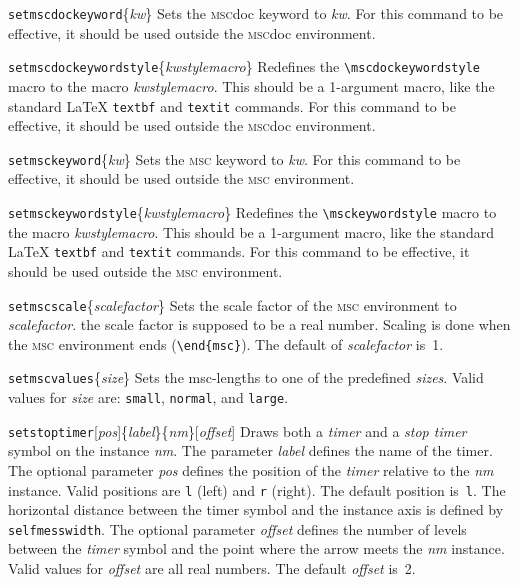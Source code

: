 \documentclass[a4paper]{article}
\newcommand{\cmd}[1]{\texttt{\bslash #1}}
\newcommand{\acro}[1]{{\scshape\lowercase{#1}}}
\newcommand\MSC{\acro{MSC}}
\newcommand{\MSCdoc}{\MSC{}doc}
\newcommand{\opt}[1]{[#1]}
\newenvironment{defs}{%
  \begin{list}{}%
              {\setlength{\labelwidth}{0pt}%
               \setlength{\labelsep}{1em}%
               \setlength{\leftmargin}{1em}%
               \setlength{\parsep}{1ex}%
               \setlength{\listparindent}{0pt}%
               \setlength{\rightmargin}{0pt}%
               \renewcommand{\makelabel}[1]{##1}%
               \raggedright%
              }%
  }{%
  \end{list}}
\begin{document}
\begin{defs}
\item[\cmd{setmscdockeyword}\{\emph{kw}\}] Sets the \MSCdoc{} keyword to
\emph{kw}. For this command to be effective, it should be used outside
the \MSCdoc{} environment.

\item[\cmd{setmscdockeywordstyle}\{\emph{kwstylemacro}\}] Redefines the
\verb|\mscdockeywordstyle| macro to the macro \emph{kwstylemacro}. This
should be a 1-argument macro, like the standard \LaTeX{}
\cmd{textbf} and \cmd{textit}  commands. For this command to be effective, it
should be used outside the \MSCdoc{} environment.


\item[\cmd{setmsckeyword}\{\emph{kw}\}] Sets the \MSC{} keyword to
\emph{kw}. For this command to be effective, it should be used outside
the \MSC{} environment.

\item[\cmd{setmsckeywordstyle}\{\emph{kwstylemacro}\}] Redefines the
\verb|\msckeywordstyle| macro to the macro \emph{kwstylemacro}. This
should be a 1-argument macro, like the standard \LaTeX{}
\cmd{textbf} and \cmd{textit}  commands. For this command to be effective, it
should be used outside the \MSC{} environment.

\item[\cmd{setmscscale}\{\emph{scalefactor}\}] Sets the scale factor
of the \MSC{} environment to \emph{scalefactor}. the scale factor is
supposed to be a real number. Scaling is done when the \MSC{}
environment ends (\verb|\end{msc}|). The default of \emph{scalefactor}
is~1.


\item[\cmd{setmscvalues}\{\emph{size}\}] Sets the msc-lengths to one
of the predefined \emph{sizes}. Valid values for \emph{size} are:
\verb|small|, \verb|normal|, and \verb|large|.

\item[\cmd{setstoptimer}\opt{\emph{pos}}\{\emph{label}\}\{\emph{nm}\}\opt{\emph{offset}}]
Draws both a \emph{timer} and a \emph{stop timer} symbol on the
instance \emph{nm}.  The parameter \emph{label} defines the name of
the timer. The optional parameter \emph{pos} defines the position of
the \emph{timer} relative to the \emph{nm} instance. Valid positions
are \verb|l| (left) and \verb|r| (right). The default position
is~\verb|l|. The horizontal distance between the timer symbol and the
instance axis is defined by \verb+selfmesswidth+. The optional
parameter \emph{offset} defines the number of levels between the
\emph{timer} symbol and the point where the arrow meets the \emph{nm}
instance. Valid values for \emph{offset} are all real numbers. The 
default \emph{offset} is~2. 
 

\end{defs}
\end{document}
